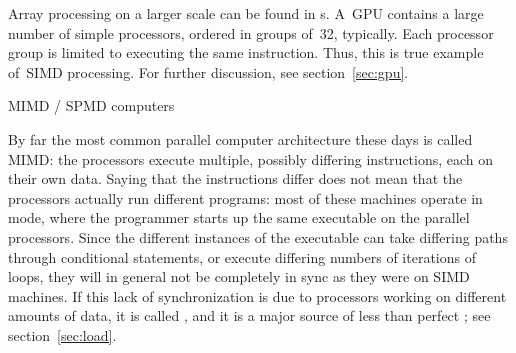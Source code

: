 Array processing on a larger scale can be found in
s. A~\ac{GPU} contains a large number of simple
processors, ordered in groups of~32, typically. Each processor group
is limited to executing the same instruction. Thus, this is true
example of~\ac{SIMD} processing.
For further discussion, see section~\ref{sec:gpu}.

 {MIMD / SPMD computers}
\label{sec:mimd}\label{sec:spmd}

By far the most common parallel computer architecture these days is
called \acf{MIMD}: the processors execute multiple, possibly differing
instructions, each on their own data. Saying that the instructions
differ does not mean that the processors actually run different
programs: most of these machines operate in  mode, where the
programmer starts up the same executable on the parallel processors.
Since the different instances of the executable can take differing
paths through conditional statements, or execute differing numbers of
iterations of loops, they will in general not be completely in sync as
they were on \ac{SIMD} machines. If this lack of synchronization is
due to processors working on different amounts of data, it is
called , and it is a major source of less
than perfect ; see section~\ref{sec:load}.

